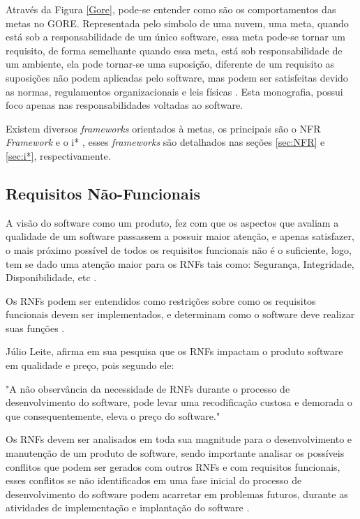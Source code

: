 \pagebreak

 Através da Figura \ref{Gore}, pode-se entender como são os comportamentos das metas no GORE. Representada pelo simbolo de uma nuvem, uma meta, quando está sob a responsabilidade de um único software, essa meta pode-se tornar um requisito, de forma semelhante quando essa meta, está sob responsabilidade de um ambiente, ela pode tornar-se uma suposição, diferente de um requisito as suposições não podem aplicadas pelo software, mas podem ser satisfeitas devido as normas, regulamentos organizacionais e leis físicas \cite{van2001goal}. Esta monografia, possui foco apenas nas responsabilidades voltadas ao software.


Existem diversos \textit{frameworks} orientados à metas, os principais  são o NFR \textit{Framework} \cite{chung2012non} e o i* \cite{istarwiki20}, esses \textit{frameworks} são detalhados nas seções \ref{sec:NFR} e \ref{sec:i*}, respectivamente.

\subsection{Requisitos Não-Funcionais}
\label{subsec:requisitosNaoFuncionais}

A visão do software como um produto, fez com que os aspectos que avaliam a qualidade de um software passassem a possuir maior atenção, e apenas satisfazer, o mais próximo possível de todos os requisitos funcionais não é o suficiente, logo, tem se dado uma atenção maior para os RNFs tais como: Segurança, Integridade, Disponibilidade, etc \cite{cysneiros1997definindo}.

Os RNFs podem ser entendidos como restrições sobre como os requisitos funcionais devem ser implementados, e determinam como o software deve realizar suas funções \cite{sommerville1997requirements}.


Júlio Leite, afirma em sua pesquisa que os RNFs impactam o produto software em qualidade e preço, pois segundo ele:

\begin{citacao}
	"A não observância da necessidade de RNFs durante o processo de desenvolvimento do software, pode levar uma recodificação custosa e demorada o que consequentemente, eleva o preço do software." \cite[p. 2]{cysneiros1997definindo}
\end{citacao}

Os RNFs devem ser analisados em toda sua magnitude para o desenvolvimento e manutenção de um produto de software, sendo importante analisar os possíveis conflitos que podem ser gerados com outros RNFs e com requisitos funcionais, esses conflitos se não identificados em uma fase inicial do processo de desenvolvimento do software podem acarretar em problemas futuros, durante as atividades de implementação e implantação do software \cite{cysneiros1997definindo}. 


